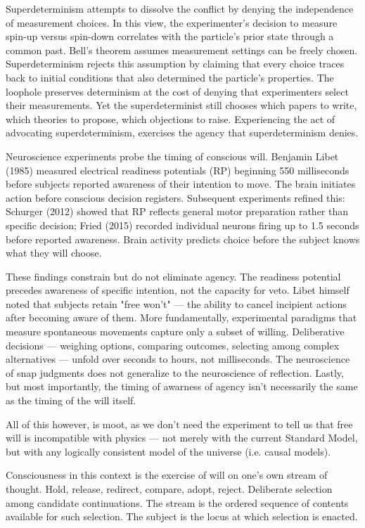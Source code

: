 Superdeterminism attempts to dissolve the conflict by denying the independence of measurement choices. In this view, the experimenter's decision to measure spin-up versus spin-down correlates with the particle's prior state through a common past. Bell's theorem assumes measurement settings can be freely chosen. Superdeterminism rejects this assumption by claiming that every choice traces back to initial conditions that also determined the particle's properties. The loophole preserves determinism at the cost of denying that experimenters select their measurements. Yet the superdeterminist still chooses which papers to write, which theories to propose, which objections to raise. Experiencing the act of advocating superdeterminism, exercises the agency that superdeterminism denies.

Neuroscience experiments probe the timing of conscious will. Benjamin Libet (1985) measured electrical readiness potentials (RP) beginning 550 milliseconds before subjects reported awareness of their intention to move. The brain initiates action before conscious decision registers. Subsequent experiments refined this: Schurger (2012) showed that RP reflects general motor preparation rather than specific decision; Fried (2015) recorded individual neurons firing up to 1.5 seconds before reported awareness. Brain activity predicts choice before the subject knows what they will choose.

These findings constrain but do not eliminate agency. The readiness potential precedes awareness of specific intention, not the capacity for veto. Libet himself noted that subjects retain "free won't" — the ability to cancel incipient actions after becoming aware of them. More fundamentally, experimental paradigms that measure spontaneous movements capture only a subset of willing. Deliberative decisions — weighing options, comparing outcomes, selecting among complex alternatives — unfold over seconds to hours, not milliseconds. The neuroscience of snap judgments does not generalize to the neuroscience of reflection. Lastly, but most importantly, the timing of awarness of agency isn't necessarily the same as the timing of the will itself. 

All of this however, is moot, as we don't need the experiment to tell us that free will is incompatible with physics — not merely with the current Standard Model, but with any logically consistent model of the universe (i.e. causal models).

Consciousness in this context is the exercise of will on one's own stream of thought. Hold, release, redirect, compare, adopt, reject. Deliberate selection among candidate continuations. The stream is the ordered sequence of contents available for such selection. The subject is the locus at which selection is enacted.

